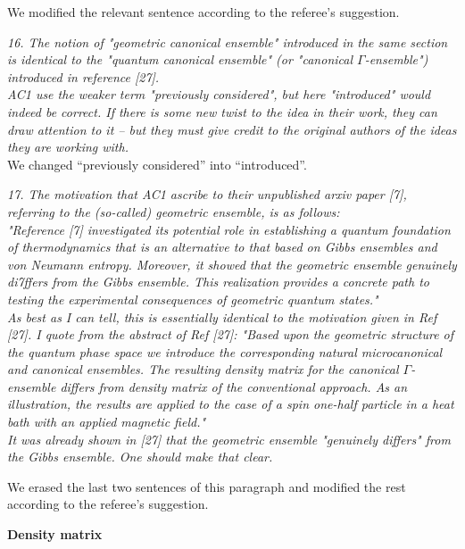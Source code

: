 \documentclass{article}
\newcommand{\REVIEW}[1]{{ \it \textcolor{reviewblack}{#1}}}
\newcommand{\REPLY}[1]{\textcolor{UCDBlue}{#1}}
\begin{document}
\REPLY{We modified the relevant sentence according to the referee's suggestion.}

\REVIEW{16. The notion of "geometric canonical ensemble" introduced in the same section is identical to the "quantum canonical ensemble" (or "canonical $\Gamma$-ensemble") introduced in reference [27].}\\

\REVIEW{AC1 use the weaker term "previously considered", but here "introduced" would indeed be correct. If there is some new twist to the idea in their work, they can draw attention to it -- but they must give credit to the original authors of the ideas they are working with.}\\

\REPLY{We changed ``previously considered'' into ``introduced''.}

\REVIEW{17. The motivation that AC1 ascribe to their unpublished arxiv paper [7], referring to the (so-called) geometric ensemble, is as follows:}\\

\REVIEW{"Reference [7] investigated its potential role in establishing a quantum foundation of thermodynamics that is an alternative to that based on Gibbs ensembles and von Neumann entropy. Moreover, it showed that the geometric ensemble genuinely di7ffers from the Gibbs ensemble. This realization provides a concrete path to testing the experimental consequences of geometric quantum states."}\\

\REVIEW{As best as I can tell, this is essentially identical to the motivation given in Ref [27]. I quote from the abstract of Ref [27]: "Based upon the geometric structure of the quantum phase space we introduce the corresponding natural microcanonical and canonical ensembles. The resulting density matrix for the canonical $\Gamma$-ensemble differs from density matrix of the conventional approach. As an illustration, the results are applied to the case of a spin one-half particle in a heat bath with an applied magnetic field."}\\

\REVIEW{It was already shown in [27] that the geometric ensemble "genuinely differs" from the Gibbs ensemble. One should make that clear.}

\REPLY{We erased the last two sentences of this paragraph and modified the rest according to the referee's suggestion.}

{\bf Density matrix}\\
\end{document}
